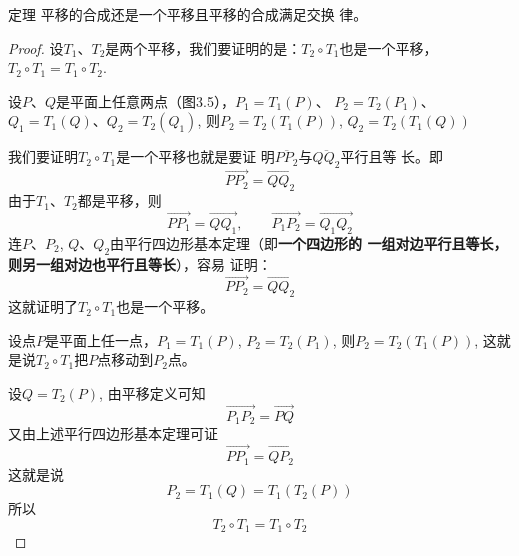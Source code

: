 \begin{blk}{定理}
    平移的合成还是一个平移且平移的合成满足交换
律。
\end{blk}

\begin{proof}
设$T_1$、$T_2$是两个平移，我们要证明的是：$T_2\circ T_1$也是一个平移，$T_2\circ T_1=T_1\circ T_2$.

设$P$、$Q$是平面上任意两点（图3.5），$P_1=T_1(P)$、
$P_2=T_2(P_1)$、$Q_1=T_1(Q)$、$Q_2=T_2(Q_1)$, 则$P_2=T_2(T_1(P))$, $Q_2=T_2(T_1(Q))$
\begin{figure}[htp]
    \centering
{}
    \caption{}
\end{figure}

我们要证明$T_2\circ T_1$是一个平移也就是要证
明$\overline{PP_2}$与$\overline{QQ_2}$平行且等
长。即
\[\Vec{PP_2}=\Vec{QQ_2}\]
由于$T_1$、$T_2$都是平移，则
\[\Vec{PP_1}=\Vec{QQ_1},\qquad \Vec{P_1P_2}=\Vec{Q_1Q_2}\]
连$P$、$P_2$, $Q$、$Q_2$由平行四边形基本定理（即\textbf{一个四边形的
一组对边平行且等长，则另一组对边也平行且等长}），容易
证明：
\[\Vec{PP_2}=\Vec{QQ_2}\]
这就证明了$T_2\circ T_1$也是一个平移。



设点$P$是平面上任一点，$P_1=T_1(P)$, $P_2=T_2(P_1)$,
则$P_2=T_2(T_1(P))$, 这就是说$T_2\circ T_1$把$P$点移动到$P_2$点。

设$Q=T_2(P)$, 由平移定义可知
\[\Vec{P_1P_2}=\Vec{PQ}\]
又由上述平行四边形基本定理可证
\[\Vec{PP_1}=\Vec{QP_2}\]
这就是说
\[P_2=T_1(Q)=T_1(T_2(P))\]
所以
\[T_2\circ T_1=T_1\circ T_2\]
\end{proof}

